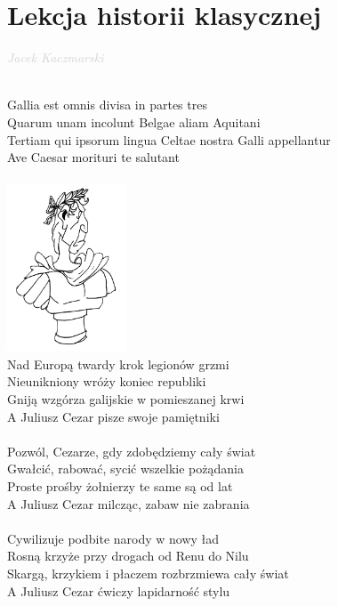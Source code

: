 \documentclass[a5paper, 10pt]{book}
\begin{document}
\newpage
\section{Lekcja historii klasycznej}\textcolor{lightgray}{\textit{Jacek Kaczmarski}}\\~\\
\begin{minipage}[t]{0.8\textwidth}
  \hspace*{5mm}Gallia est omnis divisa in partes tres\\
  \hspace*{5mm}Quarum unam incolunt Belgae aliam Aquitani\\
  \hspace*{5mm}Tertiam qui ipsorum lingua Celtae nostra Galli appellantur\\
  \hspace*{5mm}Ave Caesar morituri te salutant\\
  \\
  \includegraphics[height=5cm, right]{images/lekcja_historii_klasycznej.png}\vspace*{-5.05cm}\\
  Nad Europą twardy krok legionów grzmi\\
  Nieunikniony wróży koniec republiki\\
  Gniją wzgórza galijskie w pomieszanej krwi\\
  A Juliusz Cezar pisze swoje pamiętniki\\
  \\
  Pozwól, Cezarze, gdy zdobędziemy cały świat\\
  Gwałcić, rabować, sycić wszelkie pożądania\\
  Proste prośby żołnierzy te same są od lat\\
  A Juliusz Cezar milcząc, zabaw nie zabrania\\
  \\
  Cywilizuje podbite narody w nowy ład\\
  Rosną krzyże przy drogach od Renu do Nilu\\
  Skargą, krzykiem i płaczem rozbrzmiewa cały świat\\
  A Juliusz Cezar ćwiczy lapidarność stylu\\
\end{minipage}
\end{document}
